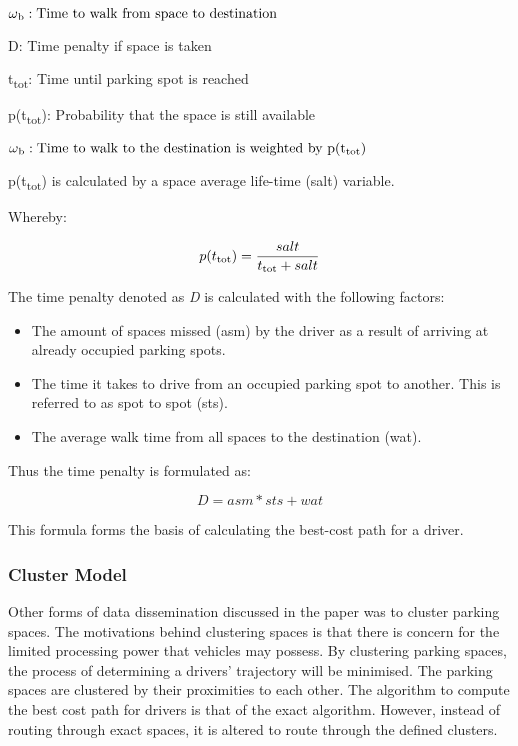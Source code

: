 \begin{math}
\omega\textsubscript{b}: \textrm{Time to walk from space to destination}
\end{math}

D: Time penalty if space is taken

t\textsubscript{tot}: Time until parking spot is reached

p(t\textsubscript{tot}): Probability that the space is still available

\begin{math}
    \omega\textsubscript{b}:  \textrm{Time to walk to the destination is weighted by p(t\textsubscript{tot})}
\end{math}

p(t\textsubscript{tot}) is calculated by a space average life-time (salt) variable. 

Whereby: 

\[ p(t\textsubscript{tot}) = \frac{salt}{t\textsubscript{tot} + salt} \]

The time penalty denoted as \textit{D} is calculated with the following factors:
\begin{itemize}
    \item The amount of spaces missed (asm) by the driver as a result of arriving at already occupied parking spots.
    \item The time it takes to drive from an occupied parking spot to another. This is referred to as spot to spot  (sts).
    \item The average walk time from all spaces to the destination (wat).
\end{itemize}

Thus the time penalty is formulated as:

\[ D = asm * sts + wat \]

This formula forms the basis of calculating the best-cost path for a driver.

\subsubsection{Cluster Model}\label{sssec:cluster}
Other forms of data dissemination discussed in the paper \citep{Verroios2011ReachingNetworking} was to cluster parking spaces. The motivations behind clustering spaces is that there is concern for the limited processing power that vehicles may possess. By clustering parking spaces, the process of determining a drivers' trajectory will be minimised. The parking spaces are clustered by their proximities to each other. The algorithm to compute the best cost path for drivers is that of the exact algorithm. However, instead of routing through exact spaces, it is altered to route through the defined clusters.

